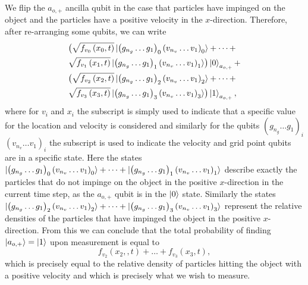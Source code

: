 We flip the $a_{o,+}$ ancilla qubit in the case that particles have impinged on the object and the particles have a positive velocity in the $x$-direction. %
Therefore, after re-arranging some qubits, we can write 
\begin{equation}
\begin{split}
    & \bigl( \sqrt{f_{v_0} \left ( x_0,t \right )} \ket{ \left ( g_{n_g} \dots g_{1} \right )_0 \left (  v_{n_v} \dots v_1 \right )_0 } + \dots +   \\ & \sqrt{f_{v_1} \left ( x_1, t\right )} \ket{ \left (  g_{n_g} \dots g_{1} \right )_1 \left (  v_{n_v} \dots v_1 \right )_1} \bigr) \ket{0}_{a_{o,+}} +  \\ & \bigl( \sqrt{f_{v_2} \left ( x_2, t \right )}\ket{\left ( g_{n_g} \dots g_{1} \right )_2 \left ( v_{n_v} \dots v_1 \right)_2} + \dots +  \\  & \sqrt{f_{v_3} \left ( x_3 ,t\right )} \ket{ \left ( g_{n_g} \dots g_{1} \right )_3 \left ( v_{n_v} \dots v_1 \right )_3}  \bigr) \ket{1}_{a_{o,+}},
    \end{split}
\end{equation}
where for $v_i$ and $x_i$  the subscript is simply used to indicate that a specific value for the location and velocity is considered and similarly for the qubits $\left ( g_{n_g} \dots g_{1} \right )_i$ $\left (  v_{n_v} \dots v_1 \right )_i$ the subscript is used to indicate the velocity and grid point qubits are in a specific state. 
Here the states $ \ket{ \left ( g_{n_g} \dots g_{1} \right )_0 \left (  v_{n_v} \dots v_1 \right )_0 } + \dots +  \ket{\left (  g_{n_g} \dots g_{1} \right )_1 \left (  v_{n_v} \dots v_1 \right )_1}$ describe exactly the particles that do not impinge on the object in the positive $x$-direction in the current time step, as the $a_{o,+}$ qubit is in the $\ket{0}$ state. Similarly the states $\ket{\left ( g_{n_g} \dots g_{1} \right )_2 \left ( v_{n_v} \dots v_1 \right)_2} + \dots + \ket{\left ( g_{n_g} \dots g_{1} \right )_3 \left ( v_{n_v} \dots v_1 \right )_3}$ represent the relative densities of the particles that have impinged the object in the positive $x$-direction.
From this we can conclude that the total probability of finding $\ket{a_{o,+}} = \ket{1}$ upon measurement is equal to \begin{equation}
    f_{v_2} \left ( x_2, ,t\right ) + \dots + f_{v_3} \left ( x_3,t \right ),
\end{equation}
which is precisely equal to the relative density of particles hitting the object with a positive velocity and which is precisely what we wish to measure. 
